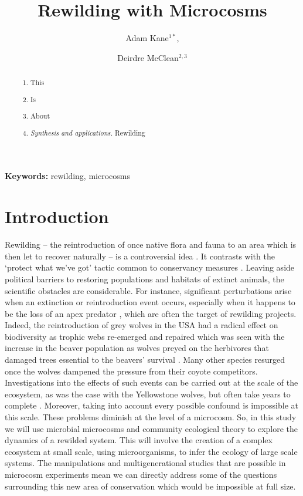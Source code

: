 \documentclass[a4paper,12pt]{article}
\title{Rewilding with Microcosms}
\author{Adam Kane$^{1*}$, \and Deirdre McClean$^{2,3}$}
\begin{document}
\maketitle


\begin{abstract}
  \noindent \begin{enumerate}
  \item This
  \item Is
  \item About
  \item \emph{Synthesis and applications.} Rewilding 
  \end{enumerate}
\end{abstract}

\noindent \textbf{Keywords:} rewilding, microcosms



\newpage


\section*{Introduction}
Rewilding – the reintroduction of once native flora and fauna to an area which is then let to recover naturally – is a controversial idea \citep{monbiot2013feral}.  
It contrasts with the ‘protect what we’ve got’ tactic common to conservancy measures \citep{monbiot2013feral}. 
Leaving aside political barriers to restoring populations and habitats of extinct animals, the scientific obstacles are considerable. 
For instance, significant perturbations arise when an extinction or reintroduction event occurs, especially when it happens to be the loss of an apex predator \citep{mittelbach1995perturbation}, which are often the target of rewilding projects. 
Indeed, the reintroduction of grey wolves in the USA had a radical effect on biodiversity as trophic webs re-emerged and repaired which was seen with the increase in the beaver population as wolves preyed on the herbivores that damaged trees essential to the beavers’ survival \citep{hebblewhite2005human}.  
Many other species resurged once the wolves dampened the pressure from their coyote competitors. 
Investigations into the effects of such events can be carried out at the scale of the ecosystem, as was the case with the Yellowstone wolves, but often take years to complete \citep{mittelbach1995perturbation}.  
Moreover, taking into account every possible confound is impossible at this scale. 
These problems diminish at the level of a microcosm. 
So, in this study we will use microbial microcosms and community ecological theory to explore the dynamics of a rewilded system. 
This will involve the creation of a complex ecosystem at small scale, using microorganisms, to infer the ecology of large scale systems. 
The manipulations and multigenerational studies that are possible in microcosm experiments mean we can directly address some of the questions surrounding this new area of conservation which would be impossible at full size. 
\end{document}

